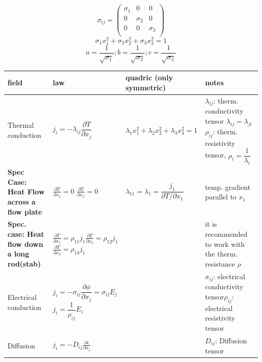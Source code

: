 \begin{multicols}{3}
\columnbreak
$$
	\sigma_{ij}=\begin{pmatrix}
		\sigma_1 & 0 & 0 \\
		0 & \sigma_2 & 0 \\
		0 & 0 & \sigma_3 \\
	\end{pmatrix}
$$
	$$\sigma_1x_1^2+\sigma_2x_2^2+\sigma_3x_3^2=1$$
	$$
	a=\frac{1}{\sqrt{\sigma_1}}; b=\frac{1}{\sqrt{\sigma_2}};
	c=\frac{1}{\sqrt{\sigma_3}}
	$$
\end{multicols}
\renewcommand{\arraystretch}{1.8}	

\begin{tabularx}{\columnwidth}{XXXX}
	\hline 
	field & law & quadric (only symmetric) & notes\\
	\hline 
	Thermal conduction &
	$j_i= -\lambda_{ij}\dfrac{\partial T}{\partial x_j} $ &
	$\lambda_1 x_1^2+\lambda_2 x_2^2+\lambda_3 x_3^2=1$ &
	$\lambda_{ij}$: therm. conductivity tensor $\lambda_{ij} = \lambda_{ji}$\newline $\rho_{ij}$: therm. resistivity tensor, $\rho_i = \dfrac{1}{\lambda_i}$\\
	
	
	\textbf{Spec Case: Heat Flow across a flow plate}&
	$\frac{\partial T}{\partial x_2}=0$ $\frac{\partial T}{\partial x_3}=0$ &	
	$
	\lambda_{11}= \lambda_1=\dfrac{j_1}{\partial T/ \partial x_1}
	$&
	temp. gradient parallel to $x_1$\\


	\textbf{Spec. case: Heat flow down a long rod(stab)} &
	$\frac{\partial T}{\partial x_1}=\rho_{11}j_1$\newline$ \frac{\partial T}{\partial x_2}=\rho_{12}j_1$\newline$ \frac{\partial T}{\partial x_3}=\rho_{13}j_1$&
	& it is recommended to work with the therm. resistance $\rho$ \\
	\hline 
	Electrical conduction & $j_i=-\sigma_{ij}\dfrac{\partial \phi}{\partial x_j}=\sigma_{ij}E_j$ \newline $j_i = \dfrac{1}{\rho_{ij}}E_i$&
	&
	$\sigma_{ij}$: electrical conductivity tensor\newline $\rho_{ij}$: electrical resistivity tensor \\
	\hline 
	Diffusion & $j_i=-D_{ij}\frac{\partial c}{\partial x_j}$&
	&
	$D_{ij}$: Diffusion tensor\\
	\hline 
\end{tabularx}
\renewcommand{\arraystretch}{1.2}	
